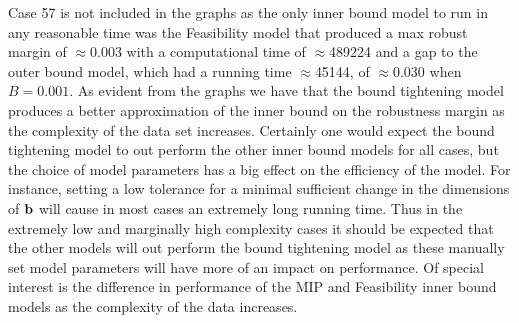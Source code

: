 Case 57 is not included in the graphs as the only inner bound model to run in any reasonable time was the Feasibility model that produced a max robust margin of $\approx$0.003 with a computational time of $\approx$489224 and a gap to the outer bound model, which had a running time $\approx$45144, of $\approx 0.030$ when $B=0.001$.
As evident from the graphs we have that the bound tightening model produces a better approximation of the inner bound on the robustness margin as the complexity of the data set increases. 
Certainly one would expect the bound tightening model to out perform the other inner bound models for all cases, but the choice of model parameters has a big effect on the efficiency of the model. 
For instance, setting a low tolerance for a minimal sufficient change in the dimensions of $\bold b$ will cause in most cases an extremely long running time. 
Thus in the extremely low and marginally high complexity cases it should be expected that the other models will out perform the bound tightening model as these manually set model parameters will have more of an impact on performance. 
Of special interest is the difference in performance of the MIP and Feasibility inner bound models as the complexity of the data increases. 






